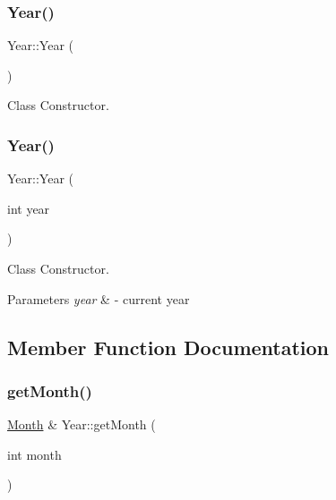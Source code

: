 \subsubsection{\texorpdfstring{Year()}{Year()}\hspace{0.1cm}{\footnotesize\ttfamily [1/2]}}
{\footnotesize\ttfamily Year\+::\+Year (\begin{DoxyParamCaption}{ }\end{DoxyParamCaption})\hspace{0.3cm}{\ttfamily [inline]}}



Class Constructor. 

\mbox{\label{class_year_ac18a4f513e8ee98b352990c6f54bd663}} 
\subsubsection{\texorpdfstring{Year()}{Year()}\hspace{0.1cm}{\footnotesize\ttfamily [2/2]}}
{\footnotesize\ttfamily Year\+::\+Year (\begin{DoxyParamCaption}\item[{int}]{year }\end{DoxyParamCaption})}



Class Constructor. 


\begin{DoxyParams}{Parameters}
{\em year} & -\/ current year \\
\hline
\end{DoxyParams}


\subsection{Member Function Documentation}
\mbox{\label{class_year_a64bc478fe629fc966b7bfadb1d939a88}} 
\subsubsection{\texorpdfstring{get\+Month()}{getMonth()}}
{\footnotesize\ttfamily \mbox{\hyperlink{class_month}{Month}} \& Year\+::get\+Month (\begin{DoxyParamCaption}\item[{int}]{month }\end{DoxyParamCaption})}



